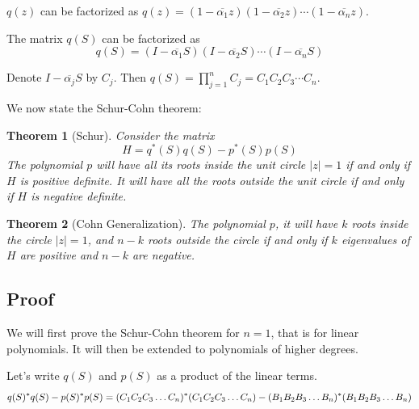 \documentclass[twoside]{article}
\newcommand*\conj[1]{\overline{#1}}
\newcommand*\adj[1]{#1^*}
\newcommand*\norm[1]{\left \Vert #1 \right\Vert}
\theoremstyle{plain}
\newtheorem{theorem}{Theorem}
\theoremstyle{definition}
\theoremstyle{remark}
\begin{document}
\(q(z)\) can be factorized as \(q(z) = (1 - \conj{\alpha_1}z) (1 - \conj{\alpha_2}z) \cdots (1 - \conj{\alpha_n}z)\). 

The matrix \(q(S)\) can be factorized as
\[q(S) = (I - \conj{\alpha_1}S) (I - \conj{\alpha_2}S) \cdots (I - \conj{\alpha_n}S)\]

 Denote \( I -  \conj{\alpha_j} S\) by \(C_j\). Then \(q(S) =\displaystyle \prod_{j=1}^n C_j = C_1 C_2 C_3 \cdots C_n\).




We now state the Schur-Cohn theorem:

\begin{theorem} [Schur] Consider the matrix  \[H = \adj{q}(S) q(S) - \adj{p}(S) p(S)\] The polynomial \(p\) will have all its roots inside the unit circle \(|z| = 1\) if and only if \(H\) is positive definite. It will have all the roots outside the unit circle if and only if \(H\) is negative definite. \end{theorem}

\begin{theorem} [Cohn Generalization] The polynomial \(p\), it will have \(k\) roots inside the circle \(|z| = 1\), and \(n-k\) roots outside the circle if and only if \(k\) eigenvalues of \(H\) are positive and \(n-k\) are negative. \end{theorem}

\subsection{Proof}

We will first prove the Schur-Cohn theorem for \(n =1\), that is for linear polynomials. It will then be extended to polynomials of higher degrees.


Let's write \(q(S)\) and \(p(S)\) as a product of the linear terms. 
\[\adj{q(S)} q(S) - \adj{p(S)} p(S) \\= \adj{(C_1C_2C_3 \ldots C_n)}(C_1C_2C_3\ldots C_n) - \adj{(B_1B_2B_3\ldots B_n)} (B_1B_2B_3\ldots B_n)\]
\end{document}
